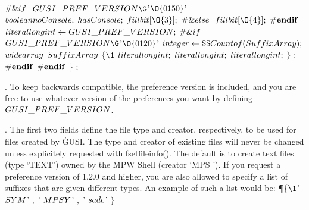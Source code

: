 \8$\#{\let\\=\bf \&{if}\ }$\1{} $\\{GUSI\_PREF\_VERSION}\G$'$\O{0150}$'\2\6
$\\{boolean}\ \\{noConsole},\;\ \\{hasConsole};$\5
\6
$\\{fill}\ \\{bit}[\O{3}];$\6
\8$\#{\let\\=\bf \&{else}\ }$\1{} \2\6
$\\{fill}\ \\{bit}[\O{4}];$\6
\8$\#{\let\\=\bf \\{endif}}$\1{} \2\6
$\\{literal}\ \\{longint}\leftarrow\\{GUSI\_PREF\_VERSION};$\6
\8$\#{\let\\=\bf \&{if}\ }$\1{} $\\{GUSI\_PREF\_VERSION}\G$'$\O{0120}$'\2\7
$\\{integer}\leftarrow\hbox{\$\$}\\{Countof}(\\{SuffixArray});$\7
$\\{wide}\ \\{array}$ $\\{SuffixArray}$ $\{\1$ $\\{literal}\ \\{longint};$\5
\6
$\\{literal}\ \\{longint};$\5
\6
$\\{literal}\ \\{longint};$\5
\6
$\}$ $;$\6
\8$\#{\let\\=\bf \\{endif}}$\1{} \2\6
\8$\#{\let\\=\bf \\{endif}}$\1{} \2\6
$\}$ $;$\par
\fi

. To keep backwards compatible, the preference version is included, and
you are free to
use whatever version of the preferences you want by defining \CD{}$\\{GUSI%
\_PREF\_VERSION}$\DC{}.

\fi

. The first two fields define the file type and creator, respectively, to
be used
for files created by \.{GUSI}. The type and creator of existing files will
never
be changed unless explicitely requested with fsetfileinfo(). The default is to
create text files (type `TEXT') owned by the \.{MPW Shell} (creator `MPS '). If
you
request a preference version of 1.2.0 and higher, you are also allowed to
specify
a list of suffixes that are given different types. An example of such a list
would be:
\Y\P $\{\1$' $\\{SYM}$' $,\;$' $\\{MPSY}$' $,\;$' $\\{sade}$' $\}$\par
\fi

